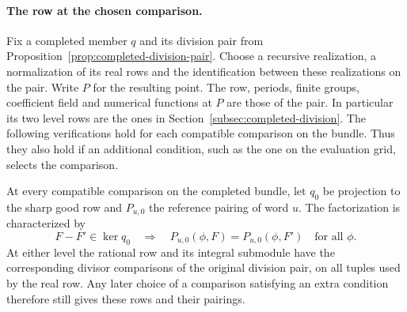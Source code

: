 \paragraph{The row at the chosen comparison.}
\label{par:linked-family-rows}
Fix a completed member \(q\) and its division pair from
Proposition~\ref{prop:completed-division-pair}. Choose a recursive
realization, a normalization of its real rows and the identification
between these realizations on the pair. Write \(P\) for the resulting point. The row,
periods, finite groups, coefficient field and numerical functions
at \(P\) are those of the pair. In particular its two level rows
are the ones in Section~\ref{subsec:completed-division}. The
following verifications hold for each compatible comparison on
the bundle. Thus they also hold if an additional condition, such
as the one on the evaluation grid, selects the comparison.

\begin{proposition}\label{prop:linked-comparison-rows}
At every compatible comparison on the completed bundle, let \(q_0\) be projection to the sharp good row and \(P_{u,0}\) the reference pairing of word \(u\). The factorization is characterized by
\[
 F-F'\in\ker q_0\quad\Longrightarrow\quad P_{u,0}(\phi,F)=P_{u,0}(\phi,F')\quad\text{for all }\phi.
\] At either level the rational row and its integral
submodule have the corresponding divisor comparisons of
the original division pair, on all tuples used by the real
row. Any later choice of a comparison satisfying an extra
condition therefore still gives these rows and their pairings.
\end{proposition}

